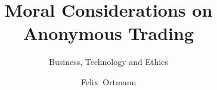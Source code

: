 \title[Moral Considerations on Anonymous Trading]{Moral Considerations on Anonymous Trading}
\subtitle{Business, Technology and Ethics}
\author{Felix~Ortmann}
\beamertemplatenavigationsymbolsempty
